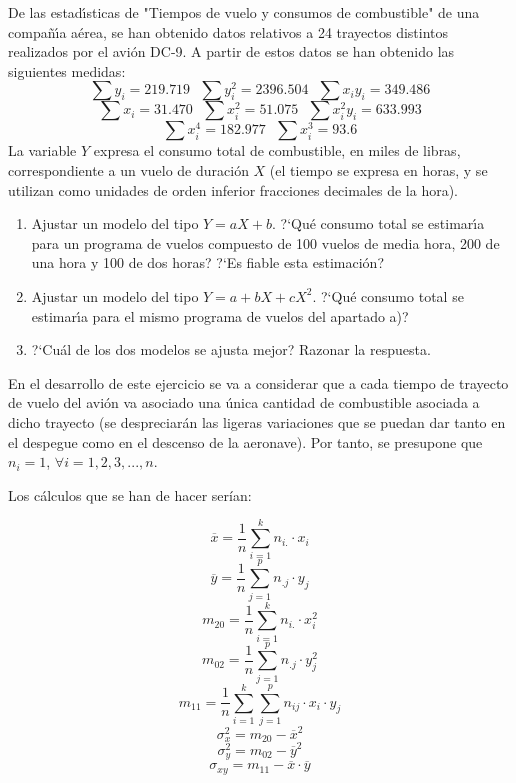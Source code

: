 \problem

De las estad{\'\i}sticas de "Tiempos de vuelo y consumos de
combustible"  de una compa{\~n}{\'\i}a a{\'e}rea, se han  obtenido  datos relativos  a  24  trayectos distintos
realizados por el avi{\'o}n DC-9. A partir de estos datos se han obtenido las siguientes medidas:
$$
\sum y_i =219\mbox{.}719 \ \ \    \sum y_{i}^{2} =2396\mbox{.}504  \ \ \   \sum
x_i y_i =349\mbox{.}486
$$
$$
\sum x_i =31\mbox{.}470  \ \ \    \sum x_{i}^{2} =51\mbox{.}075   \ \ \    \sum
x_{i}^{2} y_i =633\mbox{.}993
$$
$$
\sum x_{i}^{4} =182\mbox{.}977 \ \ \    \sum x_{i}^{3} =93\mbox{.}6
$$
La variable $Y$ expresa el consumo  total  de  combustible,  en  miles  de
libras, correspondiente a un vuelo de  duraci{\'o}n  $X$ (el tiempo  se
expresa en  horas,  y  se  utilizan  como  unidades  de  orden  inferior
fracciones decimales de la hora).

\begin{enumerate}
	\item Ajustar un modelo del tipo $Y=aX+b$.  ?`Qu{\'e} consumo total se estimar{\'\i}a  para un
	programa de vuelos compuesto de 100 vuelos de media hora,
	200 de una hora y 100 de dos horas? ?`Es fiable esta
	estimaci{\'o}n?
	
	\item Ajustar un modelo del tipo  $Y=a+bX+cX^{2}$.
	?`Qu{\'e} consumo total se estimar{\'\i}a para el mismo
	programa de vuelos del apartado a)?
	\item ?`Cu{\'a}l de los dos modelos se ajusta mejor? Razonar la respuesta. \end{enumerate}

En el desarrollo de este ejercicio se va a considerar que a cada tiempo de trayecto de vuelo del avión va asociado una única cantidad de combustible asociada a dicho trayecto (se despreciarán las ligeras variaciones que se puedan dar tanto en el despegue como en el descenso de la aeronave). Por tanto, se presupone que $n_i = 1$, $\forall i = 1,2,3,...,n$.

\subproblem

Los cálculos que se han de hacer serían: 

$$\overline{x} = \frac{1}{n}\sum_{i=1}^{k}n_{i.}·x_i$$
$$\overline{y} = \frac{1}{n}\sum_{j=1}^{p}n_{.j}·y_j$$
$$m_{20} = \frac{1}{n}\sum_{i=1}^{k}n_{i.}·x_i^2$$
$$m_{02} = \frac{1}{n}\sum_{j=1}^{p}n_{.j}·y_j^2$$
$$m_{11} = \frac{1}{n}\sum_{i=1}^{k}\sum_{j=1}^{p}n_{ij}·x_i·y_j$$
$$ \sigma_x^2 = m_{20} - \overline{x}^2$$
$$ \sigma_y^2 = m_{02} - \overline{y}^2$$
$$ \sigma_{xy} = m_{11} - \overline{x}·\overline{y}$$

